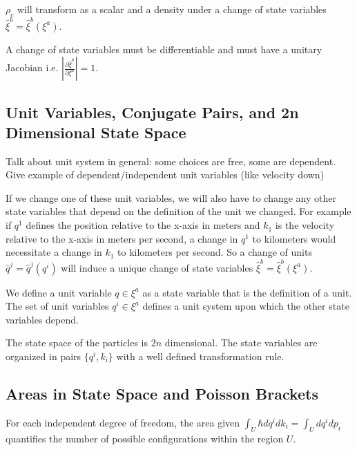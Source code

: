 \documentclass{article}
\begin{document}
\begin{prop}
	$\rho_c$ will transform as a scalar and a density under a change of state variables $\hat{\xi}^b = \hat{\xi}^b(\xi^a)$.
\end{prop}

\begin{prop}
	A change of state variables must be differentiable and must have a unitary Jacobian i.e. $\left|\frac{\partial\hat{\xi}^b}{\partial\xi^a}\right| = 1$.
\end{prop}

\subsection{Unit Variables, Conjugate Pairs, and 2n Dimensional State Space}

Talk about unit system in general: some choices are free, some are dependent. Give example of dependent/independent unit variables (like velocity down)

If we change one of these unit variables, we will also have to change any other state variables that depend on the definition of the unit we changed. For example if $q^1$ defines the position relative to the x-axis in meters and $k_1$ is the velocity relative to the x-axis in meters per second, a change in $q^1$ to kilometers would necessitate a change in $k_1$ to kilometers per second. So a change of units $\hat{q}^j = \hat{q}^j(q^i)$ will induce a unique change of state variables $\hat{\xi}^b = \hat{\xi}^b(\xi^a)$.

\begin{defn}
	We define a unit variable $q \in \xi^a$ as a state variable that is the definition of a unit. The set of unit variables $q^i \in \xi^a$ defines a unit system upon which the other state variables depend.
\end{defn}



\begin{prop}
	The state space of the particles is $2n$ dimensional. The state variables are organized in pairs $\{q^i, k_i\}$ with a well defined transformation rule.
\end{prop}

\subsection{Areas in State Space and Poisson Brackets}
	
\begin{prop}
	For each independent degree of freedom, the area given $\int_U \hbar dq^i dk_i = \int_U dq^i dp_i$ quantifies the number of possible configurations within the region $U$.
\end{prop}
\end{document}
